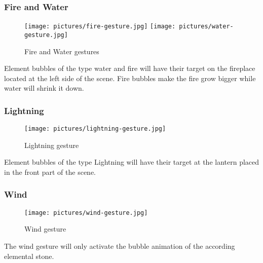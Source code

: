 \subsubsection{Fire and Water}
\begin{figure}[!ht]
\texttt{[image: pictures/fire-gesture.jpg]}
\texttt{[image: pictures/water-gesture.jpg]}
\caption{Fire and Water gestures}
\end{figure}

Element bubbles of the type water and fire will have their target on the fireplace located at the left side of the scene. Fire bubbles make the fire grow bigger while water will shrink it down.

\subsubsection{Lightning}
\begin{figure}[!ht]
\texttt{[image: pictures/lightning-gesture.jpg]}
\caption{Lightning gesture}
\end{figure}

Element bubbles of the type Lightning will have their target at the lantern placed in the front part of the scene.

\subsubsection{Wind}
\begin{figure}[!ht]
\texttt{[image: pictures/wind-gesture.jpg]}
\caption{Wind gesture}
\end{figure}
The wind gesture will only activate the bubble animation of the according elemental stone.